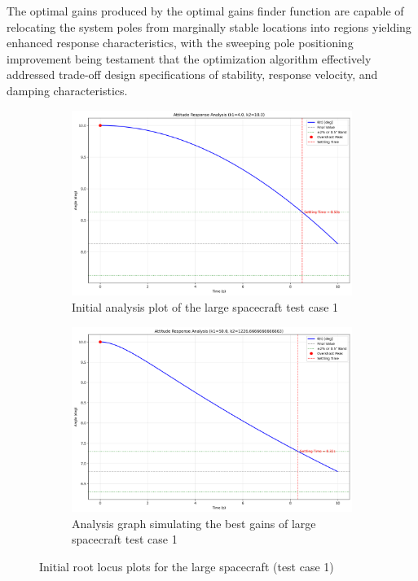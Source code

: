 \documentclass{ifacconf}
\begin{document}
The optimal gains produced by the optimal gains finder function are capable of relocating the system poles from marginally stable locations into regions yielding enhanced response characteristics, with the sweeping pole positioning improvement being testament that the optimization algorithm effectively addressed trade-off design specifications of stability, response velocity, and damping characteristics. 

 

\begin{figure}[H]
    \centering
    \begin{subfigure}[b]{0.48\columnwidth}
        \centering
        \includegraphics[width=\linewidth]{analysis/base_analysis(1).pdf}
        \caption{Initial analysis plot of the large spacecraft test case 1}
        \label{fig:subfig1}
    \end{subfigure}
    \hfill
    \begin{subfigure}[b]{0.48\columnwidth}
        \centering
        \includegraphics[width=\linewidth]{best_gains/analysis/best_analysis(1).pdf}
        \caption{Analysis graph simulating the best gains of large spacecraft test case 1}
        \label{fig:subfig2}
    \end{subfigure}
    \caption{Initial root locus plots for the large spacecraft (test case 1)}
    \label{fig:combined}
\end{figure}
\end{document}
